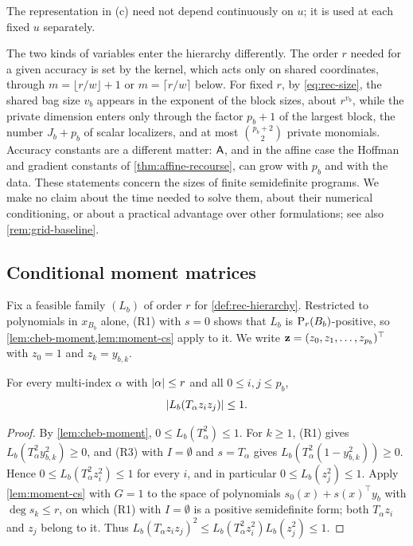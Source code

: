 The representation in (c) need not depend continuously on $u$; it is used
at each fixed $u$ separately.

\begin{remark}\label{rem:rec-dimension}
The two kinds of variables enter the hierarchy differently. The order $r$
needed for a given accuracy is set by the kernel, which acts only on shared
coordinates, through $m=\lfloor r/w\rfloor+1$ or $m=\lceil r/w\rceil$ below.
For fixed $r$, by \eqref{eq:rec-size}, the shared bag size $v_b$ appears
in the exponent of the block sizes, about $r^{v_b}$, while the private
dimension enters only through the factor $p_b+1$ of the largest block, the
number $J_b+p_b$ of scalar localizers, and at most $\binom{p_b+2}{2}$ private
monomials. Accuracy constants are a different matter: $\mathsf{A}$, and in the
affine case the Hoffman and gradient constants of \cref{thm:affine-recourse},
can grow with $p_b$ and with the data. These statements concern the sizes
of finite semidefinite programs. We make no claim about the time needed to
solve them, about their numerical conditioning, or about a practical
advantage over other formulations; see also \cref{rem:grid-baseline}.
\end{remark}

\subsection{Conditional moment matrices}\label{sec:rec-conditional}

Fix a feasible family $(L_b)$ of order $r$ for \cref{def:rec-hierarchy}.
Restricted to polynomials in $x_{B_b}$ alone, (R1) with $s=0$ shows that
$L_b$ is $\mathrm{P}_r(B_b)$-positive, so \cref{lem:cheb-moment,lem:moment-cs}
apply to it. We write $\mathbf{z}=(z_0,z_1,\dots,z_{p_b})^\top$ with $z_0=1$ and
$z_k=y_{b,k}$.

\begin{lemma}\label{lem:mixed-moment}
For every multi-index $\alpha$ with $\lvert \alpha\rvert\le r$ and all
$0\le i,j\le p_b$,
\[
  \lvert L_b(T_\alpha z_iz_j)\rvert\le1 .
\]
\end{lemma}

\begin{proof}
By \cref{lem:cheb-moment}, $0\le L_b(T_\alpha^2)\le1$. For $k\ge1$, (R1)
gives $L_b(T_\alpha^2y_{b,k}^2)\ge0$, and (R3) with $I=\emptyset$ and
$s=T_\alpha$ gives $L_b(T_\alpha^2(1-y_{b,k}^2))\ge0$. Hence
$0\le L_b(T_\alpha^2z_i^2)\le1$ for every $i$, and in particular
$0\le L_b(z_j^2)\le1$. Apply \cref{lem:moment-cs} with $G=1$ to the space of
polynomials $s_0(x)+s(x)^\top y_b$ with $\deg s_k\le r$, on which (R1) with
$I=\emptyset$ is a positive semidefinite form; both $T_\alpha z_i$ and $z_j$
belong to it. Thus $L_b(T_\alpha z_iz_j)^2\le L_b(T_\alpha^2z_i^2)L_b(z_j^2)
\le1$.
\end{proof}

